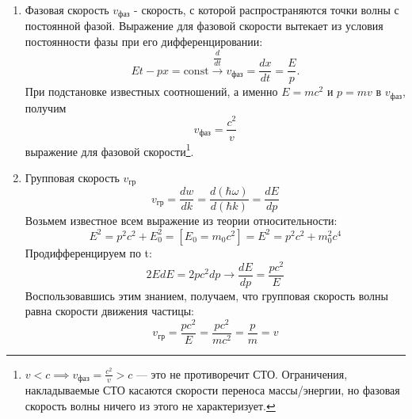 \begin{multicols}{2}
\begin{enumerate}[label=\textbf{№~\arabic{enumi}}]
	\item Фазовая скорость $v_\text{фаз}$ - скорость, с которой распространяются точки волны с постоянной фазой.
	Выражение для фазовой скорости вытекает из условия постоянности фазы при его дифференцировании:
	\begin{equation*}
		Et-px=\mathrm{const} \overset{\dfrac{d}{dt}}{\longrightarrow} v_\text{фаз} = \frac{dx}{dt} = \frac{E}{p}.
	\end{equation*}
	При подстановке известных соотношений, а именно $E=mc^2$ и $p=mv$ в $v_\text{фаз}$, получим
	\begin{equation*}
		v_\text{фаз} = \frac{c^2}{v}
	\end{equation*} выражение для фазовой скорости\footnote{$v<c \implies v_\text{фаз} = \frac{c^2}{v} > c$ --- это не противоречит СТО. Ограничения, накладываемые СТО касаются скорости переноса массы/энергии, но фазовая скорость волны ничего из этого не характеризует.}.
	
	\item Групповая скорость $v_\text{гр}$
	\begin{equation*}
		v_\text{гр} = \frac{dw}{dk} = \frac{d(\hbar\omega)}{d(\hbar k)} = \frac{dE}{dp}
	\end{equation*}
	Возьмем известное всем выражение из теории относительности:
	\begin{equation*}
		E^2=p^2c^2+E_0^2=\left[E_0=m_0c^2\right]=E^2=p^2c^2+m_0^2c^4
	\end{equation*}
	Продифференцируем по t:
	\begin{equation*}
		2EdE=2pc^2dp\longrightarrow\frac{dE}{dp}=\frac{pc^2}{E}
	\end{equation*}
	Воспользовавшись этим знанием, получаем, что групповая скорость волны равна скорости движения частицы:
	\begin{equation*}
		v_\text{гр} = \frac{pc^2}{E} = \frac{pc^2}{mc^2} = \frac{p}{m} = v
	\end{equation*}
	

\end{enumerate}
\end{multicols}
